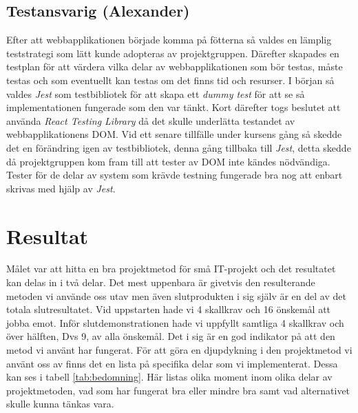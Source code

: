 \documentclass[conference]{IEEEtran}
\begin{document}
\subsection{Testansvarig (Alexander)}
Efter att webbapplikationen började komma på fötterna så valdes en lämplig teststrategi som lätt kunde adopteras av projektgruppen. Därefter skapades en testplan för att 
värdera vilka delar av webbapplikationen som bör testas, måste testas och som eventuellt kan testas om det finns tid och resurser. I början så valdes \textit{Jest} som 
testbibliotek för att skapa ett \textit{dummy test} för att se så implementationen fungerade som den var tänkt. Kort därefter togs beslutet att använda \textit{React Testing Library} 
då det skulle underlätta testandet av webbapplikationens DOM. Vid ett senare tillfälle under kursens gång så skedde det en förändring igen av testbibliotek, denna gång tillbaka 
till \textit{Jest}, detta skedde då projektgruppen kom fram till att tester av DOM inte kändes nödvändiga. Tester för de delar av system som krävde testning fungerade bra 
nog att enbart skrivas med hjälp av \textit{Jest}.

\section{Resultat}
Målet var att hitta en bra projektmetod för små IT-projekt och det resultatet kan delas in i två delar. Det mest uppenbara är givetvis den resulterande metoden vi använde oss utav men även slutprodukten i sig själv är en del av det totala slutresultatet. Vid uppstarten hade vi 4 skallkrav och 16 önskemål att jobba emot. Inför slutdemonstrationen hade vi uppfyllt samtliga 4 skallkrav och över hälften, Dvs 9, av alla önskemål. Det i sig är en god indikator på att den metod vi använt har fungerat. För att göra en djupdykning i den projektmetod vi använt oss av finns det en lista på specifika delar som vi implementerat. Dessa kan ses i tabell \ref{tab:bedomning}. Här listas olika moment inom olika delar av projektmetoden, vad som har fungerat bra eller mindre bra samt vad alternativet skulle kunna tänkas vara.
\end{document}
